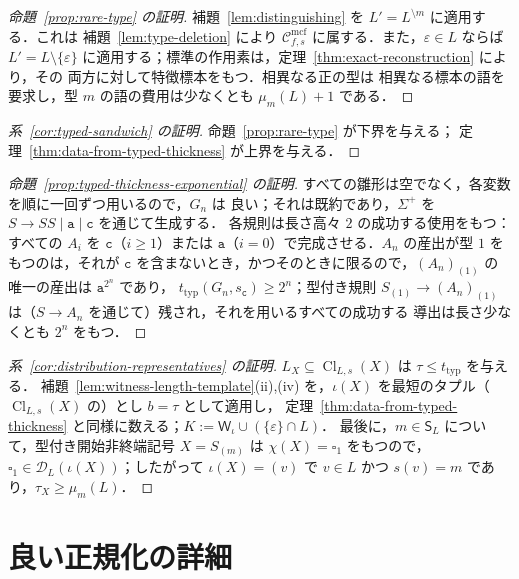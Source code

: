 \documentclass[11pt,a4paper]{ltjsarticle}
\numberwithin{equation}{section}
\theoremstyle{plain}
\theoremstyle{definition}
\theoremstyle{remark}
\newcommand{\Wit}{\mathsf{W}}
\newcommand{\Cmcf}[2]{\mathcal{C}^{\mathrm{mcf}}_{#1,#2}}
\newcommand{\D}{\mathcal{D}}
\newcommand{\blank}{\square}
\newcommand{\eps}{\varepsilon}
\theoremstyle{plain}
\begin{document}
\begin{proof}[命題~\ref{prop:rare-type} の証明]
補題~\ref{lem:distinguishing} を $L'=L^{\setminus m}$ に適用する．これは
補題~\ref{lem:type-deletion} により $\Cmcf{f}{s}$ に属する．また，$\eps\in L$ ならば
$L'=L\setminus\{\eps\}$ に適用する；標準の作用素は，定理~\ref{thm:exact-reconstruction} により，その
両方に対して特徴標本をもつ．相異なる正の型は
相異なる標本の語を要求し，型 $m$ の語の費用は少なくとも $\mu_m(L)+1$ である．
\end{proof}

\begin{proof}[系~\ref{cor:typed-sandwich} の証明]
命題~\ref{prop:rare-type} が下界を与える；
定理~\ref{thm:data-from-typed-thickness} が上界を与える．
\end{proof}

\begin{proof}[命題~\ref{prop:typed-thickness-exponential} の証明]
すべての雛形は空でなく，各変数を順に一回ずつ用いるので，$G_n$ は
良い；それは既約であり，$\Sigma^+$ を $S\to SS\mid\mathtt a\mid\mathtt c$ を通じて生成する．
各規則は長さ高々 $2$ の成功する使用をもつ：すべての $A_i$ を
$\mathtt c$（$i\ge1$）または $\mathtt a$（$i=0$）で完成させる．$A_n$ の産出が型 $1$ をもつのは，それが
$\mathtt c$ を含まないとき，かつそのときに限るので，$(A_n)_{(1)}$ の唯一の産出は $\mathtt a^{2^n}$ であり，
$t_{\mathrm{typ}}(G_n,s_{\mathtt c})\ge2^n$；型付き規則
$S_{(1)}\to(A_n)_{(1)}$ は（$S\to A_n$ を通じて）残され，それを用いるすべての成功する
導出は長さ少なくとも $2^n$ をもつ．
\end{proof}

\begin{proof}[系~\ref{cor:distribution-representatives} の証明]
$L_X\subseteq\operatorname{Cl}_{L,s}(X)$ は $\tau\le t_{\mathrm{typ}}$ を与える．
補題~\ref{lem:witness-length-template}(ii),(iv) を，$\iota(X)$ を最短のタプル（
$\operatorname{Cl}_{L,s}(X)$ の）とし $b=\tau$ として適用し，
定理~\ref{thm:data-from-typed-thickness} と同様に数える；$K:=\Wit_\iota\cup(\{\eps\}\cap L)$．
最後に，$m\in \mathsf S_L$ について，型付き開始非終端記号 $X=S_{(m)}$ は
$\chi(X)=\blank_1$ をもつので，$\blank_1\in\D_L(\iota(X))$；したがって $\iota(X)=(v)$ で
$v\in L$ かつ $s(v)=m$ であり，$\tau_X\ge\mu_m(L)$．
\end{proof}

\section{良い正規化の詳細}
\label{app:normalization-details}
\end{document}
